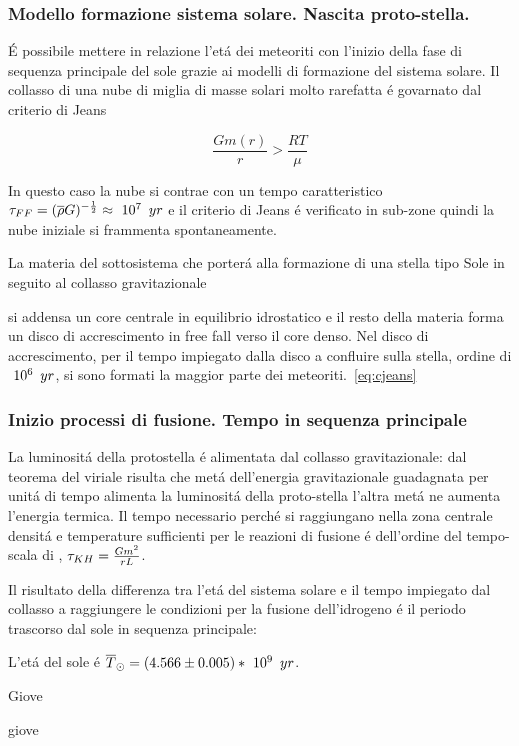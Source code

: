 \subsubsection{Modello formazione sistema solare. Nascita proto-stella.}

\'E possibile mettere in relazione l'et\'a dei meteoriti con l'inizio della fase di sequenza principale del sole grazie ai modelli di formazione del sistema solare.
Il collasso di una nube di miglia di masse solari molto rarefatta \'e govarnato dal criterio di Jeans

\begin{equation}\label{eq:cjeans}
\frac{Gm(r)}{r}>\frac{RT}{\mu}
\end{equation}

In questo caso la nube si contrae con un tempo caratteristico $\tau_{FF}=(\overline{\rho}G)^{-\frac{1}{2}}\approx\ 10^{7}\ \,yr$ e  il criterio di Jeans \'e verificato in sub-zone quindi la nube iniziale si  frammenta spontaneamente.

La materia del sottosistema che porter\'a alla formazione di una stella tipo Sole in seguito al collasso gravitazionale 

si addensa un core centrale in equilibrio idrostatico e il resto della materia forma un disco di accrescimento in free fall verso il core denso. Nel disco di accrescimento, per il tempo impiegato dalla disco a confluire sulla stella, ordine di $\ 10^{6}\ \,yr$, si sono formati la maggior parte dei meteoriti.~\ref{eq:cjeans}

\subsubsection{Inizio processi di fusione. Tempo in sequenza principale}

La luminosit\'a della protostella \'e alimentata dal collasso gravitazionale: dal teorema del viriale risulta che met\'a dell'energia gravitazionale guadagnata per unit\'a di tempo alimenta la luminosit\'a della proto-stella l'altra met\'a ne aumenta l'energia termica. Il tempo necessario perch\'e si raggiungano nella zona centrale densit\'a e temperature sufficienti per le reazioni di fusione \'e dell'ordine  del tempo-scala di \kh{}, $\tau_{KH}{}=\frac{Gm^2}{rL}$.


Il risultato della differenza tra l'et\'a del sistema solare e il tempo impiegato dal collasso a raggiungere le condizioni per la fusione dell'idrogeno \'e il periodo trascorso dal sole in sequenza principale:

L'et\'a del sole \'e $\overline{T}_{\odot}=(4.566\pm0.005)*\ 10^{9}\ \,yr$.
\begin{frame}{Giove}


\end{frame}

\begin{wordonframe}{giove}


\end{wordonframe}
